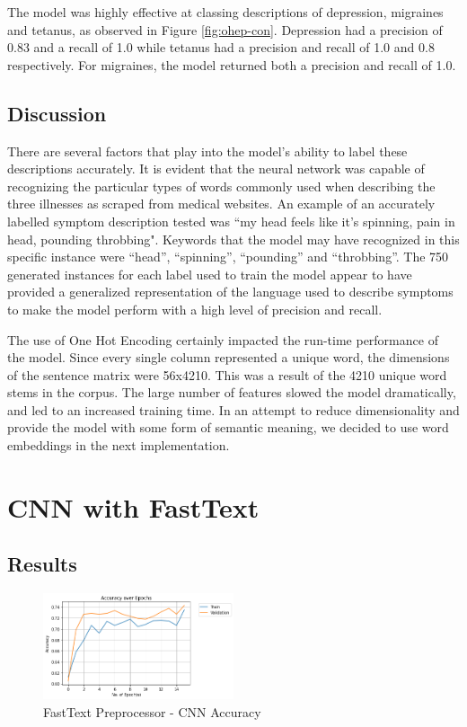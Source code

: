 \documentclass[12pt]{report}
\begin{document}
The model was highly effective at classing descriptions of
depression, migraines and tetanus, as observed in Figure \ref{fig:ohep-con}.
Depression had a precision of 0.83 and a
recall of 1.0 while tetanus had a precision and recall of 1.0 and 0.8 respectively.
For migraines, the model returned both a precision and recall of 1.0.

\subsection{Discussion}
There are several factors that play into the model's ability to label these descriptions
accurately. It is evident that the neural network was capable of recognizing the particular
types of words commonly used when describing the three illnesses as scraped from medical
websites. An example of an accurately labelled symptom description tested was ``my head
feels like it's spinning, pain in head, pounding throbbing". Keywords that the model
may have recognized in this specific instance were “head”, “spinning”, “pounding” and
“throbbing”. The 750 generated instances for each label used to train the model appear to
have provided a generalized representation of the language used to describe symptoms to make
the model perform with a high level of precision and recall.

The use of One Hot Encoding certainly impacted the run-time performance of the model.
Since every single column represented a unique word, the dimensions of the sentence matrix
were 56x4210. This was a result of the 4210 unique word stems in the corpus. The large
number of features slowed the model dramatically, and led to an increased training time.
In an attempt to reduce dimensionality and provide the model with some form of semantic
meaning, we decided to use word embeddings in the next implementation.

\section{CNN with FastText}

\subsection{Results}

\begin{figure}[H]
	\centering
	\includegraphics[width=0.5\textwidth]{accuracy-1.png}
	\caption{FastText Preprocessor - CNN Accuracy}
	\label{fig:ft-acc}
\end{figure}
\end{document}
